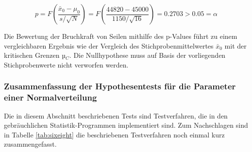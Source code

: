 \begin{equation}\label{eq:sixonehundredone}
p=F\left(\dfrac{\bar{x}_{0} -\mu _{0}}{s/\sqrt{N}} \right)=F\left(\dfrac{44820-45000}{1150/\sqrt{16}} \right)= 0.2703>0.05=\alpha
\end{equation}

\noindent Die Bewertung der Bruchkraft von Seilen mithilfe des p-Values f\"{u}hrt zu einem vergleichbaren Ergebnis wie der Vergleich des Stichprobenmittelwertes $\bar{x}_0$ mit der kritischen Grenzen µ$_{C}$. Die Nullhypothese muss auf Basis der vorliegenden Stichprobenwerte nicht verworfen werden.

\clearpage

\subsubsection{Zusammenfassung der Hypothesentests f\"{u}r die Parameter einer Normalverteilung}

\noindent Die in diesem Abschnitt beschriebenen Tests sind Testverfahren, die in den gebr\"{a}uchlichen Statistik-Programmen implementiert sind. Zum Nachschlagen sind in Tabelle \ref{tab:sixeight} die beschriebenen Testverfahren noch einmal kurz zusammengefasst.

